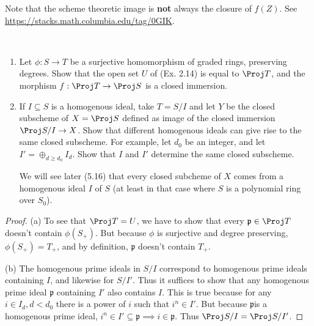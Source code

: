 \begin{rem}
	Note that the scheme theoretic image is \textbf{not} always the closure of $f(Z) $.
	See \url{https://stacks.math.columbia.edu/tag/0GIK}.
\end{rem}

\begin{exercise}
	~
	\begin{enumerate}
		\item Let $\phi : S\to T $ be a surjective homomorphism of graded rings, preserving degrees. Show that the open set $U $ of (Ex. 2.14) is equal to $\Proj T $, and the morphism $f: \Proj T \to \Proj S $ is a closed immersion.
		\item If $I \subseteq S $ is a homogenous ideal, take $T = S / I $ and let $Y $ be the closed subscheme of $X = \Proj S $ defined as image of the closed immersion $\Proj S / I \to X $. Show that different homogenous ideals can give rise to the same closed subscheme. For example, let $d_{0} $ be an integer, and let $I' = \oplus _{d \ge d_{0}} I_d $. Show that $I $ and $I' $ determine the same closed subscheme.

			We will see later (5.16) that every closed subcheme of $X $ comes from a homogenous ideal $I $ of $S $ (at least in that case where $S $ is a polynomial ring over $S_{0} $).
	\end{enumerate}
\end{exercise}
\begin{proof}
	(a) To see that $\Proj T = U $, we have to show that every $\mathfrak{p} \in \Proj T $ doesn't contain $\phi (S_+) $.
	But because $\phi$ is surjective and degree preserving, $\phi (S_+) = T_+ $, and by definition, $\mathfrak{p} $ doesn't contain $T_+ $.

	(b) The homogenous prime ideals in $S / I $ correspond to homogenous prime ideals containing $I $, and likewise for $S / I' $.
	Thus it suffices to show that any homogenous prime ideal $\mathfrak{p} $ containing $I' $ also contains $I $.
	This is true because for any $i \in I_d, d < d_{0} $ there is a power of $i$ such that $i^n \in I'$.
	But because $\mathfrak{p} $is a homogenous prime ideal, $i^n \in I' \subseteq \mathfrak{p} \implies i \in \mathfrak{p} $.
	Thus $\Proj S / I = \Proj S / I' $.
\end{proof}

